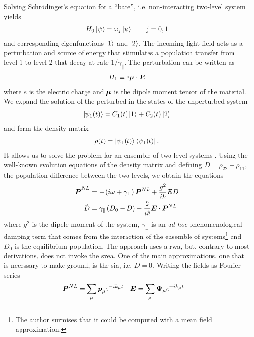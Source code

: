 Solving Schrödinger's equation for a ``bare'', i.e. non-interacting
two-level system yields
  \begin{equation}
   H_0\Ket{\psi}=\omega_j\Ket{\psi}	\qquad j=0,1
  \end{equation}
and corresponding eigenfunctions $\Ket{1}$ and $\Ket{2}$. 
The incoming light field acts as a perturbation and source of energy
that stimulates a population transfer from level 1 to level 2 that decay
at rate $1/\gamma_\parallel$. The perturbation can be written as
  \begin{equation}
   H_1 = e\boldsymbol{\mu}\cdot\boldsymbol{E}
  \end{equation}
where $e$ is the electric charge and $\boldsymbol{\mu}$ is the 
dipole moment tensor of the material.  We expand the solution 
of the perturbed in the states of the unperturbed system
  \begin{equation}
   \Ket{\psi_1(t)}=C_1(t)\Ket{1}+C_2(t)\Ket{2}
  \end{equation}
and form the density matrix
  \begin{equation}
   \rho(t) = \Ket{\psi_1(t)}\Bra{\psi_1(t)}.
  \end{equation}
It allows us to solve the problem for an ensemble
of two-level systems \cite{GE2010b}.
Using the well-known evolution equations of the density
matrix \cite[\S6.2]{BOY2008} and defining
$D=\rho_{22}-\rho_{11}$, the population difference between the two
levels,  we obtain the equations
\cite[\S5.3]{HAK1985b}
  \begin{align}
   \dot{\boldsymbol{P}}^{NL}	&= -\left(i\omega+\gamma_\perp\right)\boldsymbol{P}^{NL}+\frac{g^2}{i\hbar}\boldsymbol{E}D	\\
   \dot{D}				&= \gamma_\parallel\left(D_0-D\right)-\frac{2}{i\hbar}\boldsymbol{E}\cdot\boldsymbol{P}^{NL}
  \end{align}
where $g^2$ is the dipole moment of the system, 
$\gamma_\perp$ is an \textit{ad hoc} phenomenological damping
term that comes from the interaction of the ensemble of systems\footnote{The author surmises that it 
could be computed with a mean field approximation.}
and $D_0$ is the equilibrium population. The approach 
uses a \gls{rwa}, but, contrary 
to most derivations, does not invoke the \gls{svea}. 
One of the main approximations, one that is necessary to make
ground, is the \gls{sia}, i.e. $\dot{D}=0$. Writing the fields
as Fourier series
	\begin{align*}
		\boldsymbol{P}^{NL}	&= \sum_{\mu}\boldsymbol{p}_\mu e^{-ik_\mu t}	&	\boldsymbol{E}	&= \sum_{\mu} \boldsymbol{\Psi}_\mu e^{-ik_\mu t}
	\end{align*}
